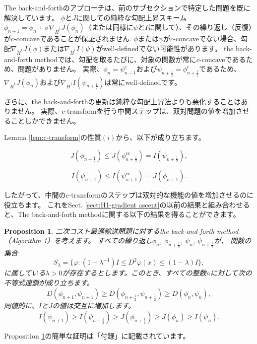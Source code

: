 \documentclass{jsarticle}
\newtheorem{prop}[thm]{Proposition}
\theoremstyle{definition}
\begin{document}
The back-and-forthのアプローチは、前のサブセクションで特定した問題を既に解決しています。 
$\phi$と$J$に関しての純粋な勾配上昇スキーム$\phi_{n + 1} = \phi_n + \sigma \nabla_{\dot{H}^1} J(\phi_n)$（または同様に$\psi$と$I$に関して）、その繰り返し（反復）が$c$-concaveであることが保証されません.
$\phi$または$\psi$が$c$-concaveでない場合、勾配$\nabla_{\dot{H}^1} J(\phi)$または$\nabla_{\dot{H}^1} I(\psi)$がwell-definedでない可能性があります。
{\color{red}
the back-and-forth methodでは、勾配を取るたびに、対象の関数が常に$c$-concaveであるため、問題がありません。
実際、$\phi_n = \psi_{n -1}^c$および$\psi_{n + \frac{1}{2}} = \phi^c_{n + \frac{1}{2}}$であるため、$\nabla_{\dot{H}^1} J(\phi_n)$および$\nabla_{\dot{H}^1} I(\psi_{n + \frac{1}{2}})$は常にwell-definedです。\\
}

さらに、the back-and-forthの更新は純粋な勾配上昇法よりも悪化することはありません。
実際、$c$-transformを行う中間ステップは、双対問題の値を増加させることしかできません。
{\color{teal}
Lemma \ref{lem:c-transform}の性質$(i)$から、以下が成り立ちます。

$$
J(\phi_{n + \frac{1}{2}}) \leq J(\phi_{n + \frac{1}{2}}^{cc}) = I(\psi_{n + \frac{1}{2}}),
$$

$$
I(\psi_{n+1}) \leq I(\psi_{n + 1}^{cc}) = J(\phi_{n+1}).
$$
}

したがって、中間の$c$-transformのステップは双対的な機能の値を増加させるのに役立ちます。
これをSect. \ref{sect:H1-gradient ascent}の以前の結果と組み合わせると、The back-and-forth methodに関する以下の結果を得ることができます。\\

\color{teal}
\begin{prop}
  \label{prop:不等式連鎖}
  二次コスト最適輸送問題に対するthe back-and-forth method（Algorithm 1）を考えます。
  すべての繰り返し$\phi_n$, $\phi_{n + \frac{1}{2}}$, $\psi_n$, $\psi_{n + \frac{1}{2}}$が、
  関数の集合
  $$
  S_{\lambda}=\{\varphi:(1-\lambda^{-1})I\leq D^2\varphi(x)\leq (1-\lambda)I\},
  $$
  に属している$\lambda > 0$が存在するとします。このとき、すべての整数$n$に対して次の不等式連鎖が成り立ちます。
  $$
  D(\phi_{n+1},\psi_{n+1})\geq D(\phi_{n + \frac{1}{2}},\psi_{n + \frac{1}{2}})\geq D(\phi_n,\psi_n),
  $$
  同値的に、$I$と$J$の値は交互に増加します。
  $$
  I(\psi_{n+1})\geq I(\psi_{n + \frac{1}{2}})\geq J(\phi_{n + \frac{1}{2}})\geq J(\phi_n)\geq I(\psi_n).
  $$
\end{prop}

\color{black}
Proposition \ref{prop:不等式連鎖}の簡単な証明は「付録」に記載されています。
\end{document}
